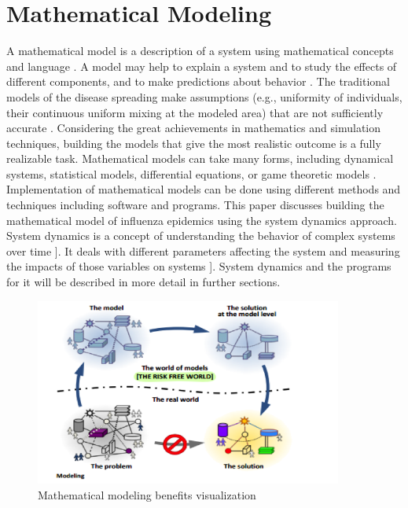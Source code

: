 \chapter{Mathematical Modeling}


A mathematical model is a description of a system using mathematical concepts and language \cite{per5}. A model may help to explain a system and to study the effects of different components, and to make predictions about behavior \cite{per6}. The traditional models of the disease spreading make assumptions (e.g., uniformity of individuals, their continuous uniform mixing at the modeled area) that are not sufficiently accurate \cite{per7}. Considering the great achievements in mathematics and simulation techniques, building the models that give the most realistic outcome is a fully realizable task. Mathematical models can take many forms, including dynamical systems, statistical models, differential equations, or game theoretic models \cite{per7}. Implementation of mathematical models can be done using different methods and techniques including software and programs. This paper discusses building the mathematical model of influenza epidemics using the system dynamics approach. System dynamics is a concept of understanding the behavior of complex systems over time \cite{per1}]. It deals with different parameters affecting the system and measuring the impacts of those variables on systems \cite{per1}]. System dynamics and the programs for it will be described in more detail in further sections.

\begin{figure}
   \centering
	\includegraphics[width=0.9\textwidth]{img/modeling}
	\caption[Clear]{Mathematical modeling benefits visualization}
\end{figure}


